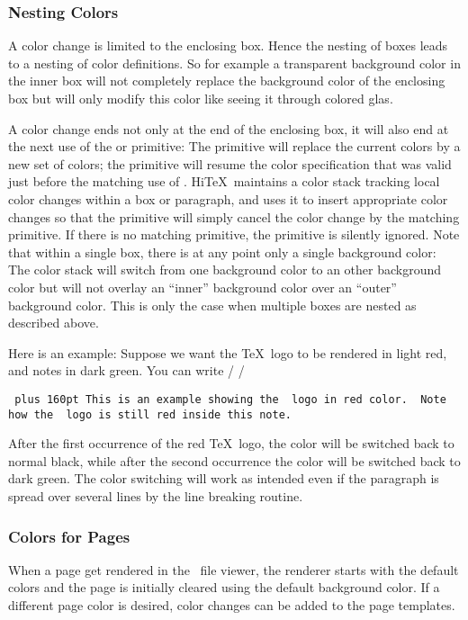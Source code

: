 \subsubsection{Nesting Colors}
A color change is limited to the enclosing box. Hence the
nesting of boxes leads to a nesting of color definitions.
So for example a transparent background color in the inner box
will not completely replace the background color of the enclosing
box but will only modify this color like seeing it through colored glas.

A color change ends not only at the end of the enclosing box,
it will also end at the next use of the 
or  primitive:
The  primitive will replace the current colors by
a new set of colors; the  primitive will resume
the color specification that was valid just before the matching use
of . Hi\TeX\ maintains a color stack tracking
local color changes within a box or paragraph, and uses it to
insert appropriate color changes so that the  primitive
will simply cancel the color change by the matching  primitive.
If there is no matching  primitive,
the  primitive is silently ignored.
Note that within a single box, there is at any point only a single
background color: The color stack will switch from one background
color to an other background color but will not overlay an ``inner''
background color over an ``outer'' background color.
This is only the case when multiple boxes are nested as described above.

Here is an example:
Suppose we want the \TeX\ logo to be rendered in light red,
and notes in dark green. You can write
\medskip
\verbatim/\def\redTeX{\HINTcolor{fg{1 0.3 0.3}}\TeX\HINTendcolor}
\def\beginnote{\HINTcolor{fg{0 0.5 0}}}
\def\endnote{\HINTendcolor}/
\medskip
{\tt\parindent 0pt\rightskip=0pt plus 160pt
This is an example showing the \BS\ logo in red color.
\ Note how the \BS\ logo is still red inside
this note.\par}
\medskip

After the first occurrence of the red \TeX\ logo, the color will be switched
back to normal black, while after the second occurrence the color will
be switched back to dark green. The color switching will work as intended
even if the paragraph is spread over several lines by the line breaking routine.


\subsubsection{Colors for Pages}
When a page get rendered in the \HINT\ file viewer,
the renderer starts with the default colors and the page is initially
cleared using the default background color. If a different page
color is desired, color changes can be added to the page templates.

